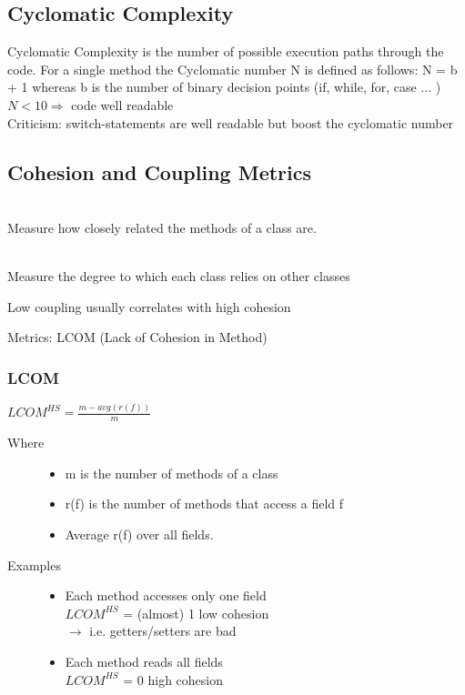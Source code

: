 \documentclass[a4paper,10pt]{article}
\newcommand{\ra}{\rightarrow}
\newcommand{\Ra}{\Rightarrow}
\begin{document}
\subsection{Cyclomatic Complexity}
Cyclomatic Complexity is the number of possible execution paths through the code. For a single method the Cyclomatic number N is defined as follows: N = b + 1 whereas b is the number of binary decision points (if, while, for, case ... ) \\
$N < 10 \Ra $ code well readable \\
Criticism: switch-statements are well readable but boost the cyclomatic number

\subsection{Cohesion and Coupling Metrics}
\begin{description}
	\item[Cohesion] \hfill \\
		Measure how closely related the methods of a class are.
	\item[Coupling / Dependency] \hfill \\
		Measure the degree to which each class relies on other classes
	\item Low coupling usually correlates with high cohesion
	\item Metrics: LCOM (Lack of Cohesion in Method)
\end{description}

\subsubsection{LCOM}
$LCOM^{HS} = \frac{m-avg(r(f))}{m}$
\begin{description}
	\item[Where] \hfill
		\begin{itemize}
			\item m is the number of methods of a class
			\item r(f) is the number of methods that access a field f
			\item Average r(f) over all fields.
		\end{itemize}
	\item[Examples] \hfill
		\begin{itemize}
			\item Each method accesses only one field \\
				$LCOM^{HS}$ = (almost) 1 low cohesion \\
				$\ra$ i.e. getters/setters are bad
			\item Each method reads all fields \\
				$LCOM^{HS}$ = 0 high cohesion
		\end{itemize}
\end{description}
\end{document}

